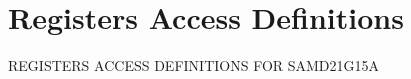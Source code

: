 \hypertarget{group___s_a_m_d21_g15_a__reg}{}\section{Registers Access Definitions}
\label{group___s_a_m_d21_g15_a__reg}
R\+E\+G\+I\+S\+T\+E\+RS A\+C\+C\+E\+SS D\+E\+F\+I\+N\+I\+T\+I\+O\+NS F\+OR S\+A\+M\+D21\+G15A 